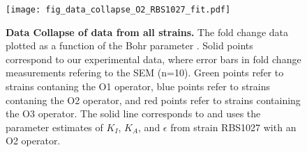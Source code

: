 \begin{figure}[h]
	\centering \texttt{[image: fig\_data\_collapse\_O2\_RBS1027\_fit.pdf]}
	\caption{{\bf Data Collapse of data from all strains.} The fold change data plotted as a function of the Bohr parameter \eref[eq10].  Solid points correspond to our experimental data, where error bars in fold change measurements refering to the SEM (n=10). Green points refer to strains contaning the O1 operator, blue points refer to strains contaning the O2 operator, and red points refer to strains containing the O3 operator. The solid line corresponds to \eref[eq10] and uses the parameter estimates of $K_I$, $K_A$, and $\epsilon$ from strain RBS1027 with an O2 operator.}
	\label{fig_result3}
\end{figure}


